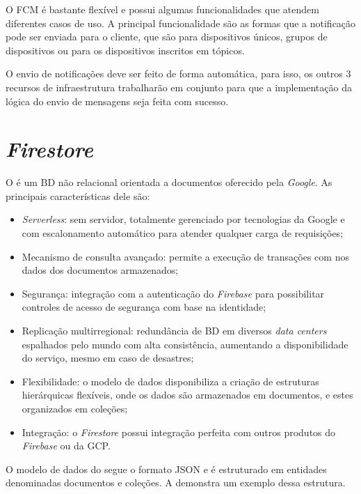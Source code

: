 O FCM é bastante flexível e possui algumas funcionalidades que atendem diferentes casos de uso. A principal funcionalidade são as formas que a notificação pode ser enviada para o cliente, que são para dispositivos únicos, grupos de dispositivos ou para os dispositivos inscritos em tópicos. 

O envio de notificações deve ser feito de forma automática, para isso, os outros 3 recursos de infraestrutura trabalharão em conjunto para que a implementação da lógica do envio de mensagens seja feita com sucesso.

\section{\textit{Firestore}}\label{sec:firestore}

O \textcite{FirestoreDocs} é um BD não relacional orientada a documentos oferecido pela \textit{Google}. As principais características dele são:

\begin{itemize}
    \item \textit{Serverless}: sem servidor, totalmente gerenciado por tecnologias da Google e com escalonamento automático para atender qualquer carga de requisições;
    \item Mecanismo de consulta avançado: permite a execução de transações com  nos dados dos documentos armazenados;
    \item Segurança: integração com a autenticação do \textit{Firebase} para possibilitar controles de acesso de segurança com base na identidade;
    \item Replicação multirregional: redundância de BD em diversos \textit{data centers} espalhados pelo mundo com alta consistência, aumentando a disponibilidade do serviço, mesmo em caso de desastres;
    \item Flexibilidade: o modelo de dados disponibiliza a criação de estruturas hierárquicas flexíveis, onde os dados são armazenados em documentos, e estes organizados em coleções;
    \item Integração: o \textit{Firestore} possui integração perfeita com outros produtos do \textit{Firebase} ou da GCP.
\end{itemize}

O modelo de dados do \textcite{FirestoreDataModel} segue o formato JSON e é estruturado em entidades denominadas documentos e coleções. A  demonstra um exemplo dessa estrutura.

